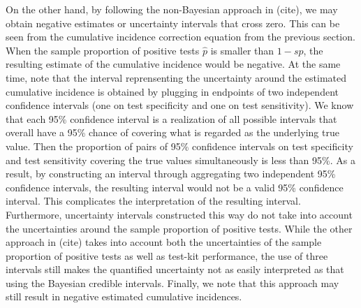 On the other hand, by following the non-Bayesian approach in (cite), we may obtain negative estimates or uncertainty intervals that cross zero. This can be seen from the cumulative incidence correction equation from the previous section. When the sample proportion of positive tests $\hat{p}$ is smaller than $1-sp$, the resulting estimate of the cumulative incidence would be negative. At the same time, note that the interval reprensenting the uncertainty around the estimated cumulative incidence is obtained by plugging in endpoints of two independent confidence intervals (one on test specificity and one on test sensitivity). We know that each 95\% confidence interval is a realization of all possible intervals that overall have a 95\% chance of covering what is regarded as the underlying true value. Then the proportion of pairs of 95\% confidence intervals on test specificity and test sensitivity covering the true values simultaneously is less than 95\%. As a result, by constructing an interval through aggregating two independent 95\% confidence intervals, the resulting interval would not be a valid 95\% confidence interval. This complicates the interpretation of the resulting interval. Furthermore, uncertainty intervals constructed this way do not take into account the uncertainties around the sample proportion of positive tests. While the other approach in (cite) takes into account both the uncertainties of the sample proportion of positive tests as well as test-kit performance, the use of three intervals still makes the quantified uncertainty not as easily interpreted as that using the Bayesian credible intervals. Finally, we note that this approach may still result in negative estimated cumulative incidences.

